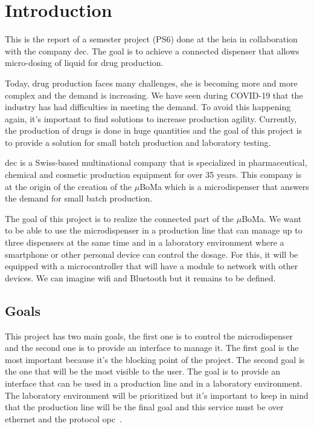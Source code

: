 \chapter{Introduction}
\label{chap:introduction}

This is the report of a semester project (PS6) done at the \acrfull{heia} in collaboration with the company \acrfull{dec}.
The goal is to achieve a connected dispenser that allows micro-dosing of liquid for drug production.

Today, drug production faces many challenges, she is becoming more and more complex and the demand is increasing.
We have seen during COVID-19 that the industry has had difficulties in meeting the demand.
To avoid this happening again, it's important to find solutions to increase production agility.
Currently, the production of drugs is done in huge quantities and the goal of this project is to provide a solution for small batch production and laboratory testing.

\acrfull{dec} is a Swiss-based multinational company that is specialized in pharmaceutical, chemical and cosmetic production equipment for over 35 years.
This company is at the origin of the creation of the $\mu$BoMa which is a microdispenser that answers the demand for small batch production.

The goal of this project is to realize the connected part of the $\mu$BoMa.
We want to be able to use the microdispenser in a production line that can manage up to three dispensers at the same time and in a laboratory environment where a smartphone or other personal device can control the dosage.
For this, it will be equipped with a microcontroller that will have a module to network with other devices.
We can imagine wifi and Bluetooth but it remains to be defined.


\section{Goals}
\label{ch:introduction:goals}

This project has two main goals, the first one is to control the microdispenser and the second one is to provide an interface to manage it.
The first goal is the most important because it's the blocking point of the project.
The second goal is the one that will be the most visible to the user.
The goal is to provide an interface that can be used in a production line and in a laboratory environment.
The laboratory environment will be prioritized but it's important to keep in mind that the production line will be the final goal and this service must be over ethernet and the protocol \acrfull{opc}~\cite{opc}.

